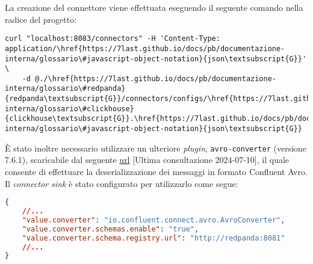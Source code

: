 La creazione del connettore viene effettuata eseguendo il seguente comando nella radice del progetto:
\begin{verbatim}
curl "localhost:8083/connectors" -H 'Content-Type: application/\href{https://7last.github.io/docs/pb/documentazione-interna/glossario\#javascript-object-notation}{json\textsubscript{G}}' \
    -d @./\href{https://7last.github.io/docs/pb/documentazione-interna/glossario\#redpanda}{redpanda\textsubscript{G}}/connectors/configs/\href{https://7last.github.io/docs/pb/documentazione-interna/glossario\#clickhouse}{clickhouse\textsubscript{G}}.\href{https://7last.github.io/docs/pb/documentazione-interna/glossario\#javascript-object-notation}{json\textsubscript{G}}
\end{verbatim}

È stato inoltre necessario utilizzare un ulteriore \textit{plugin}, \texttt{avro-converter} (versione 7.6.1), scaricabile dal seguente
\href{https://www.confluent.io/hub/confluentinc/kafka-connect-avro-converter}{\underline{url}} [Ultima consultazione 2024-07-10],
il quale consente di effettuare la deserializzazione dei messaggi in formato Confluent Avro.\\
Il \textit{connector sink} è stato configurato per utilizzarlo come segue:
\begin{lstlisting}[language=json, caption=Utilizzo del \textit{plugin} \texttt{avro-converter} all'interno del file \href{https://7last.github.io/docs/pb/documentazione-interna/glossario\#clickhouse}{\texttt{clickhouse}\textsubscript{G}}\texttt{.\href{https://7last.github.io/docs/pb/documentazione-interna/glossario\#javascript-object-notation}{json\textsubscript{G}}},captionpos=b]
{
    //...
    "value.converter": "io.confluent.connect.avro.AvroConverter",
    "value.converter.schemas.enable": "true",
    "value.converter.schema.registry.url": "http://redpanda:8081"
    //...
}
\end{lstlisting}


